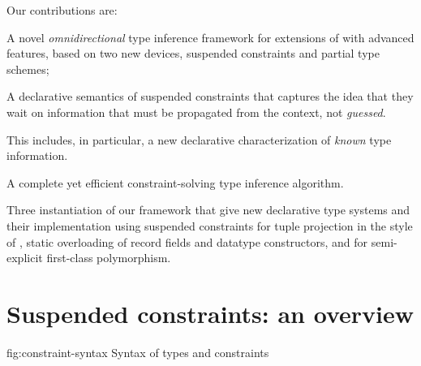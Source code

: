 \documentclass[acmsmall,screen,nonacm,review]{acmart}
\begin{document}
Our contributions are:
\begin{enumerate*}
\item
  A novel \emph{omnidirectional} type inference framework for
  extensions of \ML with advanced features, based on two new devices,
  suspended constraints and partial type schemes;

\item A declarative semantics of suspended constraints that captures the
  idea that they wait on information that must be propagated from the
  context, not \emph{guessed}.

  This includes, in particular, a new declarative characterization of
  \emph{known} type information.

\item
  A complete yet efficient constraint-solving type inference algorithm.

\item
  Three instantiation of our framework that give new declarative type
  systems and their implementation using suspended constraints for tuple
  projection in the style of \SML, static overloading of record fields and
  datatype constructors, and for semi-explicit first-class polymorphism.

\end{enumerate*}

\section{Suspended constraints: an overview}
\label{sec:constraints}

\begin{bnffig}[t]%
  {fig:constraint-syntax}%
  {Syntax of types and constraints}
\\
\entry[Types]{\t}{
    \tv \and
    \tunit \and
    \ta \to \tb \color{gray} \and
    \Pi\iton \ti \and
    \T \tys \and
    \tpoly \ts
}\\
\\[1ex]
\entry[Constraints]{\c}{
        \ctrue
  \and  \cfalse
  \and  \ca \cand \cb
  \and  \cexists \tv \c
  \and 	\cfor \tv \c
  \and  \cunif \ta \tb
  \nextline
  \and  \clet \x \tv \ca \cb
  \and  \capp \x \t
  \nextline
  \and  \cmatch \t \cbrs
}\\[1ex]
\entry[Branches]{\cbr}{\cbranch \cpat \c} \\
\entry[Patterns]{\cpat}{}{} \\[1ex]
 \\
\entry[Shapes] {\Sh} {} {}
\\
 {} {}
\end{bnffig}
\end{document}
